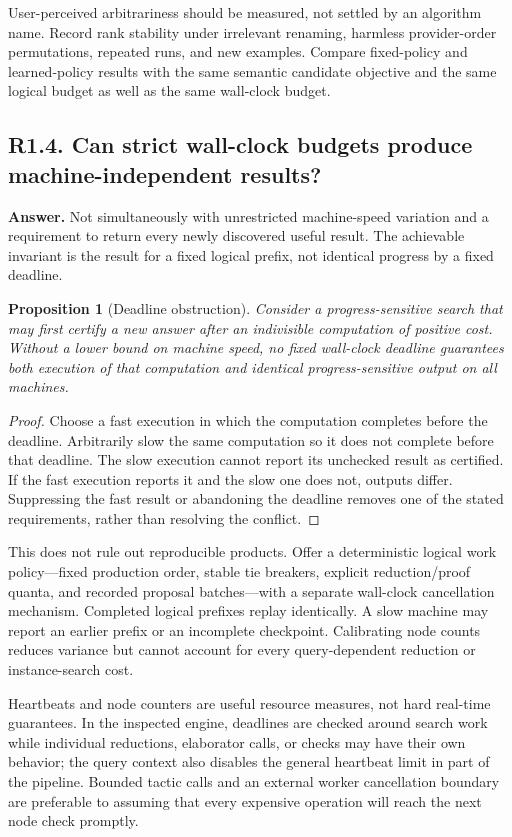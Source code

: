 \documentclass[11pt,a4paper]{article}
\newcommand{\question}[2]{\subsection{#1. #2}\label{q:#1}}
\newtheorem{proposition}[theorem]{Proposition}
\theoremstyle{definition}
\theoremstyle{remark}
\begin{document}
User-perceived arbitrariness should be measured, not settled by an algorithm name. Record rank stability under irrelevant renaming, harmless provider-order permutations, repeated runs, and new examples. Compare fixed-policy and learned-policy results with the same semantic candidate objective and the same logical budget as well as the same wall-clock budget.

\question{R1.4}{Can strict wall-clock budgets produce machine-independent results?}

\textbf{Answer.} Not simultaneously with unrestricted machine-speed variation and a requirement to return every newly discovered useful result. The achievable invariant is the result for a fixed logical prefix, not identical progress by a fixed deadline.

\begin{proposition}[Deadline obstruction]\label{prop:deadline}
Consider a progress-sensitive search that may first certify a new answer after an indivisible computation of positive cost. Without a lower bound on machine speed, no fixed wall-clock deadline guarantees both execution of that computation and identical progress-sensitive output on all machines.
\end{proposition}
\begin{proof}
Choose a fast execution in which the computation completes before the deadline. Arbitrarily slow the same computation so it does not complete before that deadline. The slow execution cannot report its unchecked result as certified. If the fast execution reports it and the slow one does not, outputs differ. Suppressing the fast result or abandoning the deadline removes one of the stated requirements, rather than resolving the conflict.
\end{proof}

This does not rule out reproducible products. Offer a deterministic logical work policy---fixed production order, stable tie breakers, explicit reduction/proof quanta, and recorded proposal batches---with a separate wall-clock cancellation mechanism. Completed logical prefixes replay identically. A slow machine may report an earlier prefix or an incomplete checkpoint. Calibrating node counts reduces variance but cannot account for every query-dependent reduction or instance-search cost.

Heartbeats and node counters are useful resource measures, not hard real-time guarantees. In the inspected engine, deadlines are checked around search work while individual reductions, elaborator calls, or checks may have their own behavior; the query context also disables the general heartbeat limit in part of the pipeline.\cite{repo-engine,repo-search} Bounded tactic calls and an external worker cancellation boundary are preferable to assuming that every expensive operation will reach the next node check promptly.
\end{document}
